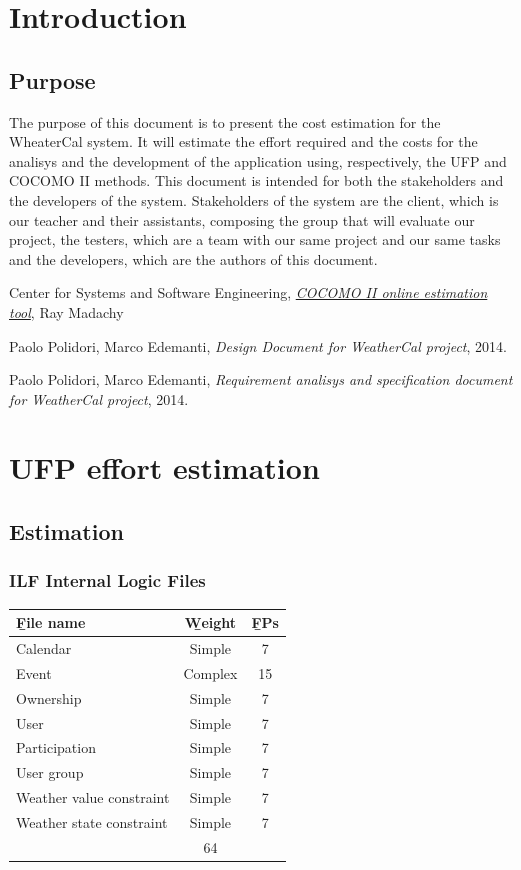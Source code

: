 \chapter{Introduction} \label{cap:cap1}

\section{Purpose}
The purpose of this document is to present the cost estimation for the WheaterCal system. It will estimate the effort required and the costs for the analisys and the development of the application using, respectively, the UFP and COCOMO II methods.
This document is intended for both the stakeholders and the developers of the system.
Stakeholders of the system are the client, which is our teacher and their assistants, composing the group that will evaluate our project, the testers, which are a team with our same project and our same tasks and the developers, which are the authors of this document.


\begin{thebibliography}{9}
Center for Systems and Software Engineering,
\textit{\href{http://csse.usc.edu/tools/COCOMOII.php}{COCOMO II online estimation tool}},
Ray Madachy
 
Paolo Polidori, Marco Edemanti,
\textit{Design Document for WeatherCal project},
2014.
 
Paolo Polidori, Marco Edemanti,
\textit{Requirement analisys and specification document for WeatherCal project},
2014.
\end{thebibliography}

\chapter{UFP effort estimation}

\section{Estimation}
\subsection{ILF Internal Logic Files}
\begin{tabularx}{\linewidth}{|X|c|c|}
  \hline \b{File name} & \b{Weight} & \b{FPs}\\
  \hline Calendar & Simple & 7 \\
  \hline Event & Complex & 15 \\
  \hline Ownership & Simple & 7 \\
  \hline User & Simple & 7 \\
  \hline Participation & Simple & 7 \\
  \hline User group & Simple & 7 \\
  \hline Weather value constraint & Simple & 7 \\
  \hline Weather state constraint & Simple & 7 \\
  \Xhline{4\arrayrulewidth} \multicolumn{2}{|l|}{Total}  & 64 \\
  \hline
\end{tabularx}
